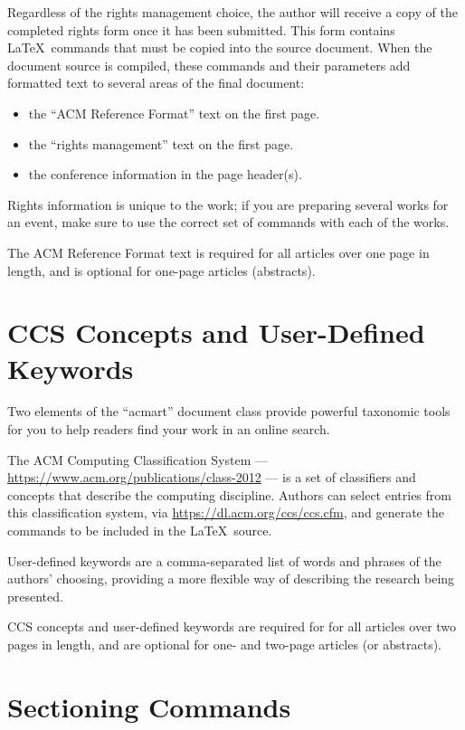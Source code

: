 \documentclass[sigconf]{acmart}
\begin{document}
Regardless of the rights management choice, the author will receive a
copy of the completed rights form once it has been submitted. This
form contains \LaTeX\ commands that must be copied into the source
document. When the document source is compiled, these commands and
their parameters add formatted text to several areas of the final
document:
\begin{itemize}
\item the ``ACM Reference Format'' text on the first page.
\item the ``rights management'' text on the first page.
\item the conference information in the page header(s).
\end{itemize}

Rights information is unique to the work; if you are preparing several
works for an event, make sure to use the correct set of commands with
each of the works.

The ACM Reference Format text is required for all articles over one
page in length, and is optional for one-page articles (abstracts).

\section{CCS Concepts and User-Defined Keywords}

Two elements of the ``acmart'' document class provide powerful
taxonomic tools for you to help readers find your work in an online
search.

The ACM Computing Classification System ---
\url{https://www.acm.org/publications/class-2012} --- is a set of
classifiers and concepts that describe the computing
discipline. Authors can select entries from this classification
system, via \url{https://dl.acm.org/ccs/ccs.cfm}, and generate the
commands to be included in the \LaTeX\ source.

User-defined keywords are a comma-separated list of words and phrases
of the authors' choosing, providing a more flexible way of describing
the research being presented.

CCS concepts and user-defined keywords are required for for all
articles over two pages in length, and are optional for one- and
two-page articles (or abstracts).

\section{Sectioning Commands}
\end{document}
